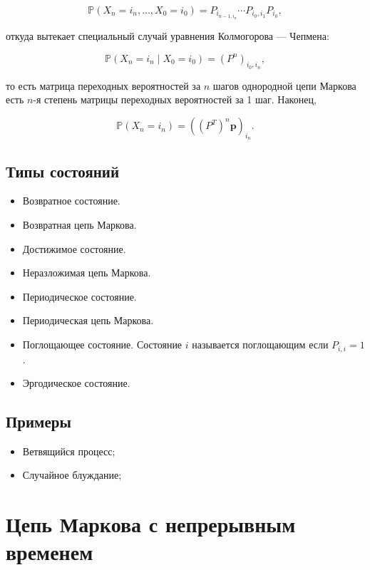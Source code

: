 \documentclass{article}
\begin{document}
\begin{equation*}
	{\mathbb  {P}}(X_{n}=i_{n},\ldots ,X_{0}=i_{0})=P_{i_{{n-1},i_{n}}} \cdots P_{{i_{0},i_{1}}}P_{{i_{0}}},
\end{equation*}

откуда вытекает специальный случай уравнения Колмогорова — Чепмена:

\begin{equation*}
	{\mathbb  {P}}(X_{n}=i_{n}\mid X_{0}=i_{0})=(P^{n})_{{i_{0},i_{n}}}, 
\end{equation*}

то есть матрица переходных вероятностей за $n$ шагов однородной цепи Маркова есть $n$-я степень матрицы переходных вероятностей за 1 шаг. Наконец,

\begin{equation*}
	{\mathbb  {P}}(X_{n}=i_{n})=\left((P^{T})^{n}{\mathbf  {p}}\right)_{{i_{n}}}.
\end{equation*}

\subsection{Типы состояний}
	\begin{itemize}
		\item Возвратное состояние.
		\item Возвратная цепь Маркова.
		\item Достижимое состояние.
		\item Неразложимая цепь Маркова.
		\item Периодическое состояние.
		\item Периодическая цепь Маркова.
		\item Поглощающее состояние. Состояние $i$ называется поглощающим если $P_{i,i}=1$.
		\item Эргодическое состояние.
	\end{itemize}

\subsection{Примеры}
\begin{itemize}
	\item Ветвящийся процесс;
	\item Случайное блуждание;
\end{itemize}

\section{Цепь Маркова с непрерывным временем}
\end{document}
